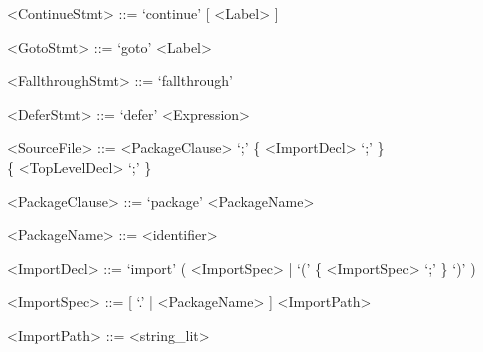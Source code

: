 \documentclass[letterpaper,11pt]{article}
\begin{document}
\begin{appendices}
\begin{grammar}
<ContinueStmt> ::= `continue' [ <Label> ]


<GotoStmt> ::= `goto' <Label>


<FallthroughStmt> ::= `fallthrough'


<DeferStmt> ::= `defer' <Expression>


<SourceFile>       ::= <PackageClause> `;' \{ <ImportDecl> `;' \} \\\{ <TopLevelDecl> `;' \}


<PackageClause>  ::= `package' <PackageName>

<PackageName>    ::= <identifier>


<ImportDecl>       ::= `import' ( <ImportSpec> | `(' \{ <ImportSpec> `;' \} `)' )

<ImportSpec>       ::= [ `.' | <PackageName> ] <ImportPath>

<ImportPath>       ::= <string_lit>

\end{grammar}

\end{appendices}
\end{document}
